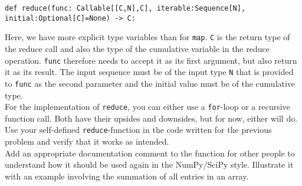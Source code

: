 \documentclass[]{erlangen-problemset}
\begin{document}
\begin{problem}[title={Building our own map and reduce functions}]
\begin{center}
	\texttt{def reduce(func: Callable[[C,N],C], iterable:Sequence[N], initial:Optional[C]=None) -> C:}
\end{center}
Here, we have more explicit type variables than for \texttt{map}. 
\texttt{C} is the return type of the reduce call and also the type of the cumulative variable in the reduce operation. 
\texttt{func} therefore needs to accept it as its first argument, but also return it as its result. 
The input sequence must be of the input type \texttt{N} that is provided to \texttt{func} as the second parameter and the initial value must be of the cumulative type. \\
For the implementation of \texttt{reduce}, you can either use a \texttt{for}-loop or a recursive function call. Both have their upsides and downsides, but for now, either will do. \\
Use your self-defined \texttt{reduce}-function in the code written for the previous problem and verify that it works as intended.\\
Add an appropriate documentation comment to the function for other people to understand how it should be used again in the NumPy/SciPy style. 
Illustrate it with an example involving the summation of all entries in an array.
\end{problem}

%
%
%

%
\end{document}
